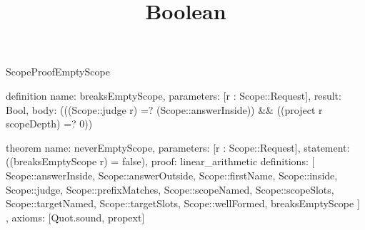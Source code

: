 \begin{lexlean}{ScopeProofEmptyScope}
\title{Boolean}
\begin{semanticmodule}
definition{
  name: breaksEmptyScope,
  parameters: [r : Scope::Request],
  result: Bool,
  body: (((Scope::judge r) =? (Scope::answerInside)) && ((project r scopeDepth) =? 0))
}

theorem{
  name: neverEmptyScope,
  parameters: [r : Scope::Request],
  statement: ((breaksEmptyScope r) = false),
  proof: linear_arithmetic{
    definitions: [
      Scope::answerInside,
      Scope::answerOutside,
      Scope::firstName,
      Scope::inside,
      Scope::judge,
      Scope::prefixMatches,
      Scope::scopeNamed,
      Scope::scopeSlots,
      Scope::targetNamed,
      Scope::targetSlots,
      Scope::wellFormed,
      breaksEmptyScope
    ]
  },
  axioms: [Quot.sound, propext]
}
\end{semanticmodule}
\end{lexlean}
